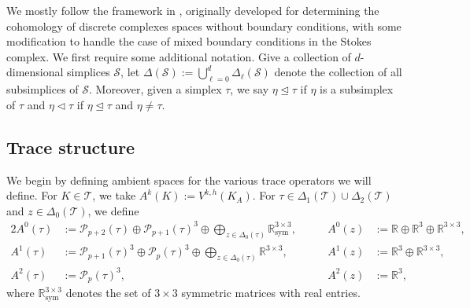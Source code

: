 \documentclass{mcom-l}
\theoremstyle{definition}
\theoremstyle{remark}
\numberwithin{equation}{section}
\DeclareMathOperator{\sym}{sym}
\DeclareMathOperator{\subsimplex}{\unlhd}
\DeclareMathOperator{\strictsubsimplex}{\lhd}
\newcommand{\mesh}[0]{\mathcal{T}}
\begin{document}
We mostly follow the framework in \cite{HuLiangLin25}, originally developed 
for determining the cohomology of discrete complexes spaces without boundary 
conditions, with some modification to handle the case of mixed boundary 
conditions in the Stokes complex. We first require some additional 
notation. Give a collection of $d$-dimensional simplices $\mathcal{S}$, let 
$\Delta(\mathcal{S}) := \bigcup_{\ell=0}^{d} \Delta_{\ell}(\mathcal{S})$
denote the collection of all subsimplices of $\mathcal{S}$. Moreover,
given a simplex $\tau$, we say $\eta \subsimplex \tau$ if 
$\eta$ is a subsimplex of $\tau$ and $\eta \strictsubsimplex \tau$
if $\eta \subsimplex \tau$ and $\eta \neq \tau$.

\subsection{Trace structure}

We begin by defining ambient spaces for the various trace operators we 
will define. 
For $K \in \mesh$, we take $A^k(K) := V^{k, h}(K_A)$.
For $\tau \in \Delta_{1}(\mesh) \cup \Delta_{2}(\mesh)$
and $z \in \Delta_0(\mesh)$, we define 
\begin{alignat*}{2}
	A^0(\tau) &:= \mathcal{P}_{p+2}(\tau) \oplus \mathcal{P}_{p+1}(\tau)^3
	\oplus \bigoplus_{z \in \Delta_0(\tau)} 
	\mathbb{R}^{3 \times 3}_{\sym}, 
	\qquad &
	A^0(z) &:= \mathbb{R} \oplus \mathbb{R}^3 \oplus \mathbb{R}^{3 \times 3}, \\
	A^1(\tau) &:= \mathcal{P}_{p+1}(\tau)^3 \oplus \mathcal{P}_{p}(\tau)^3
	\oplus \bigoplus_{z \in \Delta_0(\tau)} 
	\mathbb{R}^{3 \times 3}, 
	\qquad & 
	A^1(z) &:= \mathbb{R}^3 \oplus \mathbb{R}^{3 \times 3}, \\
	A^2(\tau) &:= \mathcal{P}_{p}(\tau)^3, 
	\qquad &
	A^2(z) &:= \mathbb{R}^3,
\end{alignat*}
where $\mathbb{R}^{3 \times 3}_{\sym}$ denotes the set of $3\times 3$ symmetric 
matrices with real entries. 
\end{document}
